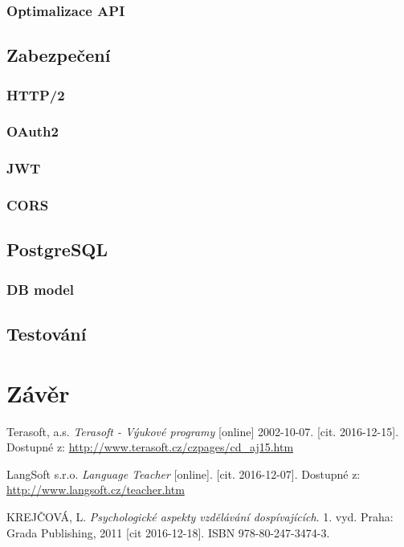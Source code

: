 \documentclass[a4paper,11pt,titlepage,fleqn]{article}
\begin{document}
        \subsubsection{Optimalizace API}

    \subsection{Zabezpečení}

        \subsubsection{HTTP/2}

        \subsubsection{OAuth2}

        \subsubsection{JWT}

        \subsubsection{CORS}

    \subsection{PostgreSQL}

        \subsubsection{DB model}

    \subsection{Testování}


\newpage
\section{Závěr}

\newpage
\begin{thebibliography}{99}
    

        Terasoft, a.s. \textit{Terasoft - Výukové programy} [online] 2002-10-07. [cit. 2016-12-15]. Dostupné z: \url{http://www.terasoft.cz/czpages/cd_aj15.htm}
    
        LangSoft s.r.o. \textit{Language Teacher} [online]. [cit. 2016-12-07]. Dostupné z: \url{http://www.langsoft.cz/teacher.htm}

        KREJČOVÁ, L. \textit{Psychologické aspekty vzdělávání dospívajících}. 1. vyd. Praha: Grada Publishing, 2011 [cit 2016-12-18]. ISBN 978-80-247-3474-3.

\end{thebibliography}
\end{document}
